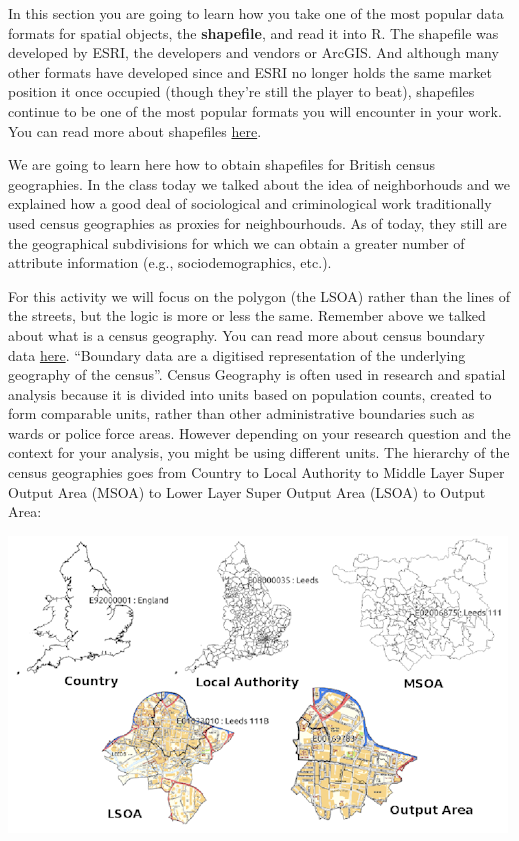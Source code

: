 \documentclass[
]{book}
\begin{document}
In this section you are going to learn how you take one of the most popular data formats for spatial objects, the \textbf{shapefile}, and read it into R. The shapefile was developed by ESRI, the developers and vendors or ArcGIS. And although many other formats have developed since and ESRI no longer holds the same market position it once occupied (though they're still the player to beat), shapefiles continue to be one of the most popular formats you will encounter in your work. You can read more about shapefiles \href{https://en.wikipedia.org/wiki/Shapefile}{here}.

We are going to learn here how to obtain shapefiles for British census geographies. In the class today we talked about the idea of neighborhouds and we explained how a good deal of sociological and criminological work traditionally used census geographies as proxies for neighbourhouds. As of today, they still are the geographical subdivisions for which we can obtain a greater number of attribute information (e.g., sociodemographics, etc.).

For this activity we will focus on the polygon (the LSOA) rather than the lines of the streets, but the logic is more or less the same. Remember above we talked about what is a census geography. You can read more about census boundary data \href{https://census.ukdataservice.ac.uk/use-data/guides/boundary-data}{here}. ``Boundary data are a digitised representation of the underlying geography of the census''. Census Geography is often used in research and spatial analysis because it is divided into units based on population counts, created to form comparable units, rather than other administrative boundaries such as wards or police force areas. However depending on your research question and the context for your analysis, you might be using different units. The hierarchy of the census geographies goes from Country to Local Authority to Middle Layer Super Output Area (MSOA) to Lower Layer Super Output Area (LSOA) to Output Area:

\includegraphics{img/maps_geography_types.png}
\end{document}
